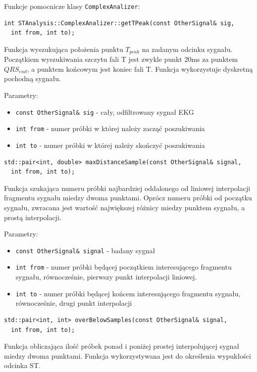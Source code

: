 \documentclass[a4paper, 11pt]{article}
\begin{document}
Funkcje pomocnicze klasy \verb|ComplexAnalizer|:

\begin{lstlisting}
int STAnalysis::ComplexAnalizer::getTPeak(const OtherSignal& sig,
  int from, int to);
\end{lstlisting}

Funkcja wyszukująca położenia punktu $T_{peak}$ na zadanym odcinku sygnału.
Początkiem wyszukiwania szczytu fali T jest zwykle punkt 20ms za punktem
$QRS_{end}$, a punktem końcowym jest koniec fali T. Funkcja wykorzystuje
dyskretną pochodną sygnału.

Parametry:
\begin{itemize}
  \item \verb|const OtherSignal& sig| - cały, odfiltrowany sygnał EKG
  \item \verb|int from| - numer próbki w której należy zacząć poszukiwania
  \item \verb|int to| - numer próbki w której należy skończyć poszukiwania
\end{itemize}


\begin{lstlisting}
std::pair<int, double> maxDistanceSample(const OtherSignal& signal, 
  int from, int to);
\end{lstlisting}

Funkcja szukająca numeru próbki najbardziej oddalonego od liniowej interpolacji
fragmentu sygnału miedzy dwoma punktami. Oprócz numeru próbki od początku
sygnału, zwracana jest wartość największej różnicy miedzy punktem sygnału, a
prostą interpolacji.

Parametry:
\begin{itemize}
  \item \verb|const OtherSignal& signal| - badany sygnał
  \item \verb|int from| - numer próbki będącej początkiem interesującego
    fragmentu sygnału, równocześnie, pierwszy punkt interpolacji liniowej.
  \item \verb|int to| - numer próbki będącej końcem interesującego fragmentu
    sygnału, równocześnie, drugi punkt interpolacji
\end{itemize}

\begin{lstlisting}
std::pair<int, int> overBelowSamples(const OtherSignal& signal,
  int from, int to);
\end{lstlisting}

Funkcja obliczająca ilość próbek ponad i poniżej prostej interpolującej sygnał
miedzy dwoma punktami. Funkcja wykorzystywana jest do określenia wypukłości
odcinka ST.
\end{document}
